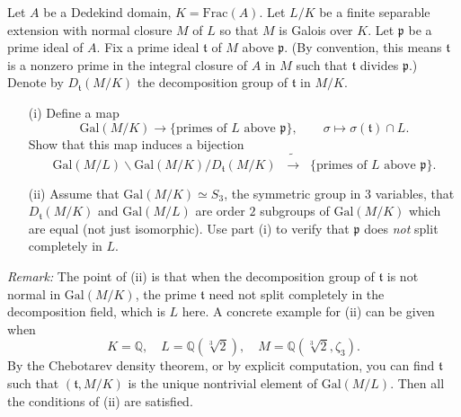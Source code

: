 \documentclass[12pt]{article}  %
\begin{document}
\begin{problem}
Let $A$ be a Dedekind domain, $K = \mathrm{Frac}(A)$. Let $L/K$ be a finite separable extension with normal closure $M$ of $L$ so that $M$ is Galois over $K$. Let $\mathfrak{p}$ be a prime ideal of $A$. Fix a prime ideal $\mathfrak{t}$ of $M$ above $\mathfrak{p}$. (By convention, this means $\mathfrak{t}$ is a nonzero prime in the integral closure of $A$ in $M$ such that $\mathfrak{t}$ divides $\mathfrak{p}$.) Denote by $D_{\mathfrak{t}}(M/K)$ the decomposition group of $\mathfrak{t}$ in $M/K$.
\begin{enumerate}
    \item[(i)] Define a map
    \[
        \mathrm{Gal}(M/K) \to \{\text{primes of $L$ above $\mathfrak{p}$}\}, 
        \qquad \sigma \mapsto \sigma(\mathfrak{t}) \cap L.
    \]
    Show that this map induces a bijection
    \[
        \mathrm{Gal}(M/L)\backslash \mathrm{Gal}(M/K)/D_{\mathfrak{t}}(M/K) \;\;\tilde{\longrightarrow}\;\; \{\text{primes of $L$ above $\mathfrak{p}$}\}.
    \]
    \item[(ii)] Assume that $\mathrm{Gal}(M/K) \simeq S_3$, the symmetric group in 3 variables, that $D_{\mathfrak{t}}(M/K)$ and $\mathrm{Gal}(M/L)$ are order $2$ subgroups of $\mathrm{Gal}(M/K)$ which are equal (not just isomorphic). Use part (i) to verify that $\mathfrak{p}$ does \emph{not} split completely in $L$.
\end{enumerate}
\textit{Remark:} The point of (ii) is that when the decomposition group of $\mathfrak{t}$ is not normal in $\mathrm{Gal}(M/K)$, the prime $\mathfrak{t}$ need not split completely in the decomposition field, which is $L$ here. A concrete example for (ii) can be given when
\[
    K = \mathbb{Q}, \quad L = \mathbb{Q}(\sqrt[3]{2}), \quad M = \mathbb{Q}(\sqrt[3]{2}, \zeta_3).
\]
By the Chebotarev density theorem, or by explicit computation, you can find $\mathfrak{t}$ such that $(\mathfrak{t}, M/K)$ is the unique nontrivial element of $\mathrm{Gal}(M/L)$. Then all the conditions of (ii) are satisfied.
\end{problem}

\begin{solution}
\end{solution}

\bigskip
\end{document}

